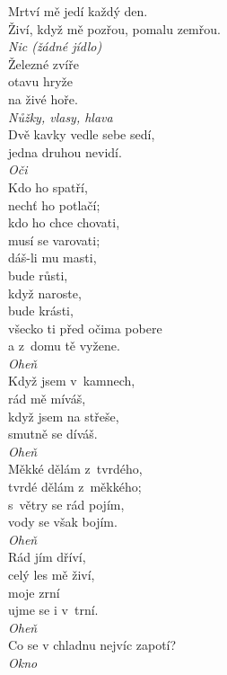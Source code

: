 \begin{multicols}{3}
\noindent
Mrtví mě jedí každý den.\\
Živí, když mě pozřou, pomalu zemřou.\\[1 mm]
{\sl Nic (žádné jídlo)}\\

\noindent
Železné zvíře\\
otavu hryže\\
na živé hoře.\\[1 mm]
{\sl Nůžky, vlasy, hlava}\\

\noindent
Dvě kavky vedle sebe sedí,\\
jedna druhou nevidí.\\[1 mm]
{\sl Oči}\\

\noindent
Kdo ho spatří,\\
nechť ho potlačí;\\
kdo ho chce chovati,\\
musí se varovati;\\
dáš-li mu masti,\\
bude růsti,\\
když naroste,\\
bude krásti,\\
všecko ti před očima pobere\\
a z~domu tě vyžene.\\[1 mm]
{\sl Oheň}\\

\noindent
Když jsem v~kamnech,\\
rád mě míváš,\\
když jsem na střeše,\\
smutně se díváš.\\[1 mm]
{\sl Oheň}\\

\noindent
Měkké dělám z~tvrdého,\\
tvrdé dělám z~měkkého;\\
s~větry se rád pojím,\\
vody se však bojím.\\[1 mm]
{\sl Oheň}\\

\noindent
Rád jím dříví,\\
celý les mě živí,\\
moje zrní\\
ujme se i v~trní.\\[1 mm]
{\sl Oheň}\\

\noindent
Co se v chladnu nejvíc zapotí?\\[1 mm]
{\sl Okno}\\


\end{multicols}
